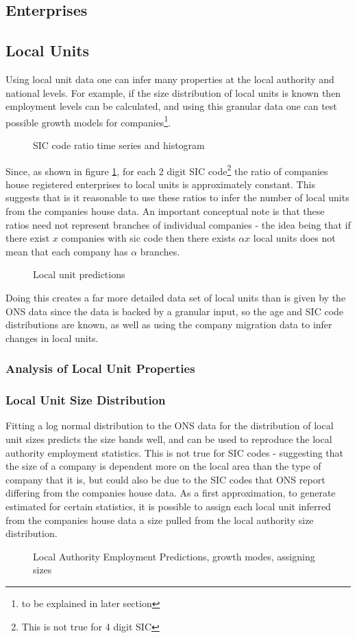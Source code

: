 \documentclass[a4paper,10pt]{article}
\begin{document}
\subsection{Enterprises}
\subsection{Local Units}
Using local unit data one can infer many properties at the local authority and national levels. For example, if the size distribution of local units is known then employment levels can be calculated, and using this granular data one can test possible growth models for companies\footnote{to be explained in later section}.
\begin{figure}[!ht]
 \caption{SIC code ratio time series and histogram}
 \label{sic_ratio}
\end{figure}

Since, as shown in figure \ref{sic_ratio}, for each 2 digit SIC code\footnote{This is not true for 4 digit SIC} the ratio of companies house registered enterprises to local units is approximately constant. This suggests that is it reasonable to use these ratios to infer the number of local units from the companies house data. An important conceptual note is that these ratios need not represent branches of individual companies - the idea being that if there exist $x$ companies with sic code then there exists $\alpha x$ local units does not mean that each company has $\alpha$ branches.

\begin{figure}[!ht]
 \caption{Local unit predictions}
 \label{local_unit_predictions}
\end{figure}

Doing this creates a far more detailed data set of local units than is given by the ONS data since the data is backed by a granular input, so the age and SIC code distributions are known, as well as using the company migration data to infer changes in local units.

\subsubsection{Analysis of Local Unit Properties}

\subsubsection{Local Unit Size Distribution}
Fitting a log normal distribution to the ONS data for the distribution of local unit sizes predicts the size bands well, and can be used to reproduce the local authority employment statistics. This is not true for SIC codes - suggesting that the size of a company is dependent more on the local area than the type of company that it is, but could also be due to the SIC codes that ONS report differing from the companies house data. As a first approximation, to generate estimated for certain statistics, it is possible to assign each local unit inferred from the companies house data a size pulled from the local authority size distribution. 
\begin{figure}[!ht]
 \caption{Local Authority Employment Predictions, growth modes, assigning sizes}
 \label{la_employment}
\end{figure}
\end{document}
